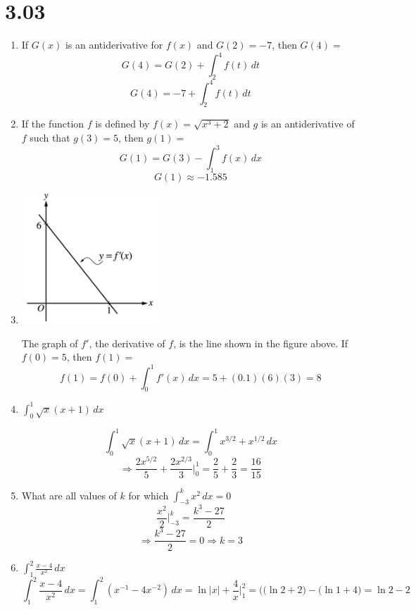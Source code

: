 \documentclass[12pt]{article}
\begin{document}
\section*{3.03}
\begin{enumerate}
    \item If $G(x)$ is an antiderivative for $f(x)$ and $G(2)=-7$, then $G(4)=$
    $$G(4)= G(2) + \int_{2}^{4} f(t) \, dt$$
     $$\boxed{G(4)= -7 + \int_{2}^{4} f(t) \, dt}$$
    \item If the function $f$ is defined by $f(x)=\sqrt{x^3+2}$ and $g$ is an antiderivative of $f$ such that $g(3) = 5$, then $g(1) =$
    $$G(1)=G(3)-\int_{1}^{3} f(x) \,dx$$
    $$\boxed{G(1)\approx -1.585}$$
    \item 
    \begin{center}
        \includegraphics[width=2in]{original-13.png}
    \end{center}
    The graph of $f'$, the derivative of $f$, is the line shown in the figure above. If $f(0)=5$, then $f(1)=$
    $$f(1)=f(0) +\int_0^1 f'(x) \,dx = 5+ (0.1)(6)(3) = \boxed{8}$$
    \item $\int_{0}^{1} \sqrt{x}(x+1) \, dx$

$$\int_{0}^{1} \sqrt{x}(x+1) \, dx = \int_{0}^{1} x^{3/2}+x^{1/2} \, dx$$
$$\Longrightarrow \frac{2x^{5/2}}{5}+ \frac{2x^{2/3}}{3} \biggr\rvert_{0}^{1} = \frac{2}{5}+\frac{2}{3} =\boxed{\frac{16}{15}}$$
    
    \item What are all values of $k$ for which $\int_{-3}^{k} x^2 \,dx=0$
    $$\frac{x^2}{2} \biggr\rvert_{-3}^{k} = \frac{k^3-27}{2}$$
    $$\Longrightarrow \frac{k^3-27}{2} =0 \Longrightarrow \boxed{k=3}$$
    \item $\int_{1}^{2} \frac{x-4}{x^2} \, dx$
$$\int_{1}^{2} \frac{x-4}{x^2} \, dx = \int_{1}^{2} (x^{-1}-4x^{-2}) \, dx = \ln |x| +\frac{4}{x} \biggr\rvert_{1}^{2}= \big( (\ln 2 +2\big) - \big(\ln 1+4 \big) = \boxed{\ln2-2}$$


\end{enumerate}
\end{document}
